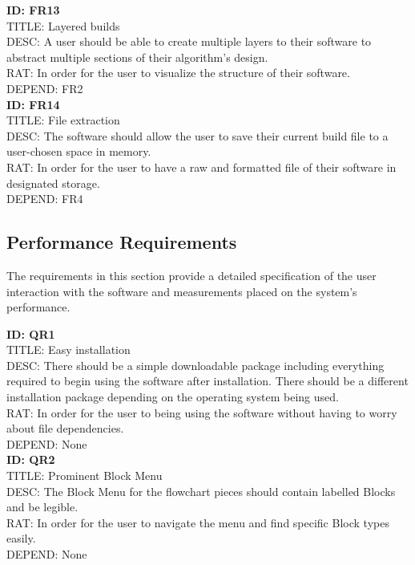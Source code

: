 \documentclass[journal,10pt,onecolumn,compsoc]{IEEEtran} \usepackage[margin=1.0in]{geometry} \usepackage{pdfpages} \usepackage{graphicx}
\begin{document}
\noindent
\textbf{ID: FR13}\\
TITLE: Layered builds\\
DESC: A user should be able to create multiple layers to their software to abstract multiple sections of their algorithm's design.\\
RAT: In order for the user to visualize the structure of their software.\\
DEPEND: FR2\\

\noindent
\textbf{ID: FR14}\\
TITLE: File extraction\\
DESC: The software should allow the user to save their current build file to a user-chosen space in memory.\\
RAT: In order for the user to have a raw and formatted file of their software in designated storage.\\
DEPEND: FR4\\


\subsection{Performance Requirements}

The requirements in this section provide a detailed specification of the user interaction with the software and measurements placed on the system's performance.

\noindent
\textbf{ID: QR1}\\
TITLE: Easy installation\\
DESC: There should be a simple downloadable package including everything required to begin using the software after installation.
There should be a different installation package depending on the operating system being used.\\
RAT: In order for the user to being using the software without having to worry about file dependencies.\\
DEPEND: None\\

\noindent
\textbf{ID: QR2}\\
TITLE: Prominent Block Menu\\
DESC: The Block Menu for the flowchart pieces should contain labelled Blocks and be legible.\\
RAT: In order for the user to navigate the menu and find specific Block types easily.\\
DEPEND: None\\
\end{document}
